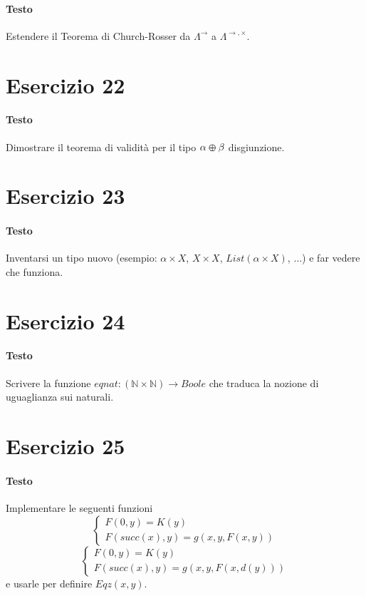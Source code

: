 \documentclass[a4paper,10pt]{article}
\begin{document}
\paragraph{Testo}
Estendere il Teorema di Church-Rosser da $\Lambda^\rightarrow$ a $\Lambda^{\rightarrow, \times}$.

\section*{Esercizio 22}
\paragraph{Testo}
Dimostrare il teorema di validità per il tipo $\alpha \varoplus \beta$ disgiunzione.

\section*{Esercizio 23}
\paragraph{Testo}
Inventarsi un tipo nuovo (esempio: $\alpha \times X$, $X \times X$, $List(\alpha \times X)$, $\dots$) e far vedere che funziona.

\section*{Esercizio 24}
\paragraph{Testo}
Scrivere la funzione $eqnat : (\mathbb{N} \times \mathbb{N}) \rightarrow Boole$ che traduca la nozione di uguaglianza sui naturali.

\section*{Esercizio 25}
\paragraph{Testo}
Implementare le seguenti funzioni
$$\begin{cases} F(0,y) = K(y) \\ F(succ(x),y) = g(x,y,F(x,y)) \end{cases}$$
$$\begin{cases} F(0,y) = K(y) \\ F(succ(x),y) = g(x,y,F(x,d(y))) \end{cases}$$
e usarle per definire $Eqz(x,y)$.
\end{document}
